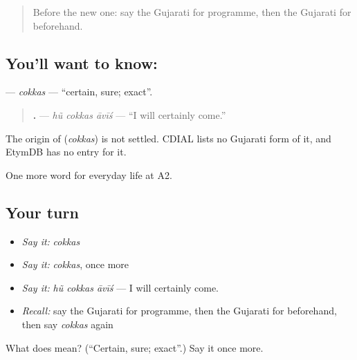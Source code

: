 \label{lesson:GU-C179-cokkas}



\begin{quote}
Before the new one: say the Gujarati for programme, then the Gujarati for beforehand.
\end{quote}

\subsection*{You'll want to know: }
\textbf{} — \emph{cokkas} — \textquotedblleft{}certain, sure; exact\textquotedblright{}.

\begin{quote}
\textbf{  .} — \emph{hũ cokkas āvīś} — \textquotedblleft{}I will certainly come.\textquotedblright{}
\end{quote}

\begin{cousinweb}
The origin of \textbf{} (\emph{cokkas}) is not settled. CDIAL lists no Gujarati form of it, and EtymDB has no entry for it.
\end{cousinweb}

\begin{grammarlens}[title={What you've built}]
One more word for everyday life at A2.
\end{grammarlens}

\subsection*{Your turn}
\begin{itemize}
\raggedright
  \item \emph{Say it:} \emph{cokkas}
  \item \emph{Say it:} \emph{cokkas}, once more
  \item \emph{Say it:} \emph{hũ cokkas āvīś} — I will certainly come.
  \item \emph{Recall:} say the Gujarati for programme, then the Gujarati for beforehand, then say \emph{cokkas} again
\end{itemize}

\begin{tcolorbox}[breakable,colback=teal!4,colframe=teal!35!black,title={Before you move on}]
What does  mean? (\textquotedblleft{}Certain, sure; exact\textquotedblright{}.) Say it once more.
\end{tcolorbox}
